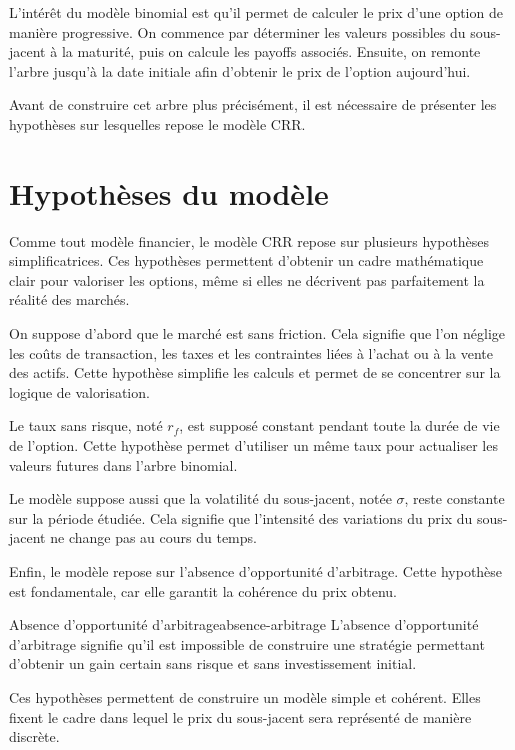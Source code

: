 \documentclass[11pt]{report}
\begin{document}
L'intérêt du modèle binomial est qu'il permet de calculer le prix d'une option de manière progressive. On commence par déterminer les valeurs possibles du sous-jacent à la maturité, puis on calcule les payoffs associés. Ensuite, on remonte l'arbre jusqu'à la date initiale afin d'obtenir le prix de l'option aujourd'hui.

Avant de construire cet arbre plus précisément, il est nécessaire de présenter les hypothèses sur lesquelles repose le modèle CRR.

\section{Hypothèses du modèle}

Comme tout modèle financier, le modèle CRR repose sur plusieurs hypothèses simplificatrices. Ces hypothèses permettent d'obtenir un cadre mathématique clair pour valoriser les options, même si elles ne décrivent pas parfaitement la réalité des marchés.

On suppose d'abord que le marché est sans friction. Cela signifie que l'on néglige les coûts de transaction, les taxes et les contraintes liées à l'achat ou à la vente des actifs. Cette hypothèse simplifie les calculs et permet de se concentrer sur la logique de valorisation.

Le taux sans risque, noté $r_f$, est supposé constant pendant toute la durée de vie de l'option. Cette hypothèse permet d'utiliser un même taux pour actualiser les valeurs futures dans l'arbre binomial.

Le modèle suppose aussi que la volatilité du sous-jacent, notée $\sigma$, reste constante sur la période étudiée. Cela signifie que l'intensité des variations du prix du sous-jacent ne change pas au cours du temps.

Enfin, le modèle repose sur l'absence d'opportunité d'arbitrage. Cette hypothèse est fondamentale, car elle garantit la cohérence du prix obtenu.

\begin{definition}{Absence d'opportunité d'arbitrage}{absence-arbitrage}
L'absence d'opportunité d'arbitrage signifie qu'il est impossible de construire une stratégie permettant d'obtenir un gain certain sans risque et sans investissement initial.
\end{definition}

Ces hypothèses permettent de construire un modèle simple et cohérent. Elles fixent le cadre dans lequel le prix du sous-jacent sera représenté de manière discrète.
\end{document}
